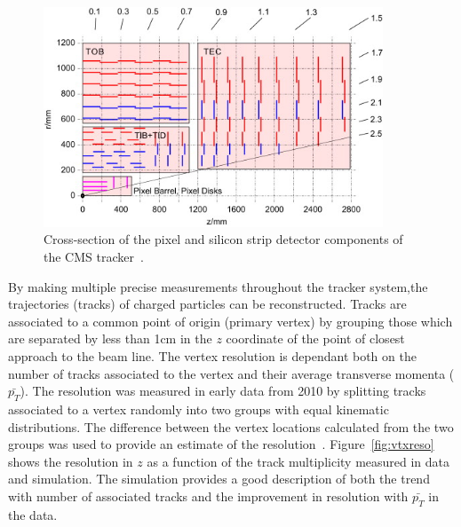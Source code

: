 \begin{figure}
	\centering
	\includegraphics[width=0.9\textwidth]{detector/trcker/tracker_col.jpg}
	\caption{Cross-section of the pixel and silicon strip detector 
	components of the CMS tracker~\citep{Weber201159}.}
   \label{fig:trackergeom}
\end{figure}

By making multiple precise measurements throughout the tracker system,the trajectories (tracks) of charged 
particles can be reconstructed.
Tracks are associated to a common point of origin (primary vertex) by grouping those which are separated
by less than 1cm in the $z$ coordinate of the point of closest approach to the beam line.
The vertex resolution is dependant both on the number of tracks associated to the vertex and
their average transverse momenta ($\bar{p_{T}}$). The resolution was measured in early data from 2010
by splitting tracks associated to a vertex randomly into two groups with equal kinematic distributions.
The difference between the vertex locations calculated from the two groups was used to provide an estimate 
of the resolution~\citep{TRK-10-005}.
Figure~\ref{fig:vtxreso} shows the resolution in $z$ as a function of the track multiplicity
measured in data and simulation. The simulation provides a good description of both the trend with 
number of associated tracks and the improvement in resolution with $\bar{p_{T}}$ in the data. 

